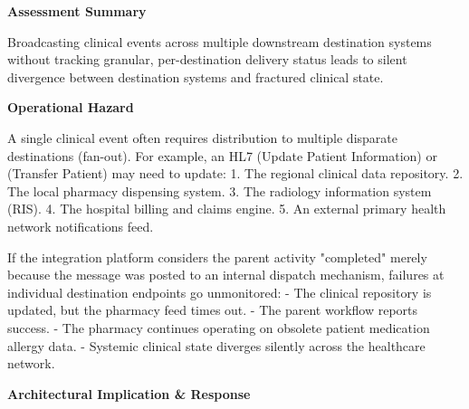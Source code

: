 \par\medskip\textbf{Assessment Summary}\par


Broadcasting clinical events across multiple downstream destination systems without tracking granular, per-destination delivery status leads to silent divergence between destination systems and fractured clinical state.



\par\medskip\textbf{Operational Hazard}\par


A single clinical event often requires distribution to multiple disparate destinations (fan-out). For example, an HL7 \texttt{} (Update Patient Information) or \texttt{} (Transfer Patient) may need to update:
1. The regional clinical data repository.
2. The local pharmacy dispensing system.
3. The radiology information system (RIS).
4. The hospital billing and claims engine.
5. An external primary health network notifications feed.



If the integration platform considers the parent activity "completed" merely because the message was posted to an internal dispatch mechanism, failures at individual destination endpoints go unmonitored:
- The clinical repository is updated, but the pharmacy feed times out.
- The parent workflow reports success.
- The pharmacy continues operating on obsolete patient medication allergy data.
- Systemic clinical state diverges silently across the healthcare network.



\par\medskip\textbf{Architectural Implication \& Response}\par


